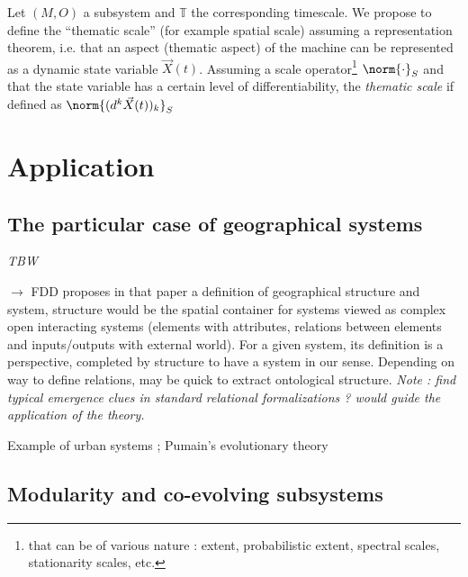 Let $(M,O)$ a subsystem and $\mathbb{T}$ the corresponding timescale. We propose to define the ``thematic scale'' (for example spatial scale) assuming a representation theorem, i.e. that an aspect (thematic aspect) of the machine can be represented as a dynamic state variable $\vec{X}(t)$. Assuming a scale operator\footnote{that can be of various nature : extent, probabilistic extent, spectral scales, stationarity scales, etc.} $\norm{\cdot}_{S}$ and that the state variable has a certain level of differentiability, the \emph{thematic scale} if defined as $\norm{(d^k \vec{X}(t))_k}_S$


\section*{Application}

\subsection*{The particular case of geographical systems}







\textit{TBW}

\cite{dollfus1975some} %
$\rightarrow$ FDD proposes in that paper a definition of geographical structure and system, structure would be the spatial container for systems viewed as complex open interacting systems (elements with attributes, relations between elements and inputs/outputs with external world). For a given system, its definition is a perspective, completed by structure to have a system in our sense. Depending on way to define relations, may be quick to extract ontological structure. \textit{Note : find typical emergence clues in standard relational formalizations ? would guide the application of the theory.}

Example of urban systems ; Pumain's evolutionary theory~\cite{pumain2010theorie}


\subsection*{Modularity and co-evolving subsystems}

